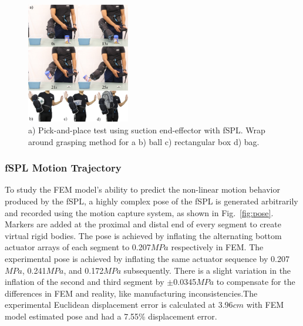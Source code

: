\documentclass[letterpaper, 10 pt, conference]{ieeeconf}  %
\begin{document}
\begin{figure}[b!]

\vspace*{-0.5cm}
\centering
\includegraphics[width=0.40\textwidth]{Figures/pick_place_whole_body_v4}
\caption{a) Pick-and-place test using suction end-effector with fSPL. Wrap around grasping method for a b) ball c) rectangular box d) bag.}
% 
% 
\label{fig:pick_place_whole_body}
\end{figure}
\subsubsection{fSPL Motion Trajectory}
To study the FEM model's ability to predict the non-linear motion behavior produced by the fSPL, a highly complex pose of the fSPL is generated arbitrarily and recorded using the motion capture system, as shown in Fig.~\ref{fig:pose}. Markers are added at the proximal and distal end of every segment to create virtual rigid bodies. The pose is achieved by inflating the alternating bottom actuator arrays of each segment to 0.207$MPa$ respectively in FEM. The experimental pose is achieved by inflating the same actuator sequence by 0.207$MPa$, 0.241$MPa$, and 0.172$MPa$ subsequently. There is a slight variation in the inflation of the second and third segment by $\pm$0.0345$MPa$ to compensate for the differences in FEM and reality, like manufacturing inconsistencies.The experimental Euclidean displacement error is calculated at 3.96$cm$ with FEM model estimated pose and had a 7.55\% displacement error. 

% 
% 
\end{document}
